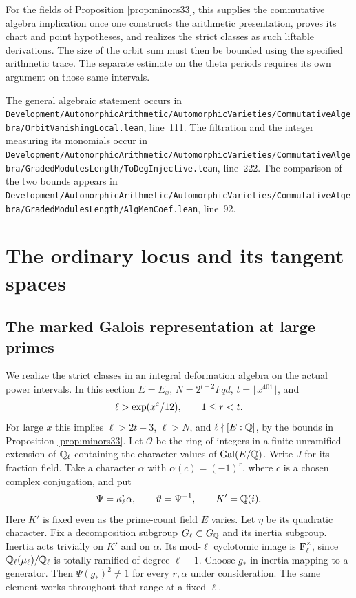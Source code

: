\documentclass[a4paper,11pt]{article}
\theoremstyle{definition}
\theoremstyle{remark}
\newcommand{\lead}[1]{\par\smallskip\noindent{\bfseries\color{ink}#1.}\enspace}
\newcommand{\srcloc}[2]{{\small\nolinkurl{#1.lean}}, line~#2}
\numberwithin{equation}{section}
\newcommand{\OO}{\mathcal O}
\begin{document}
For the fields of Proposition \ref{prop:minors33}, this supplies the commutative algebra implication once one constructs the arithmetic presentation, proves its chart and point hypotheses, and realizes the strict classes as such liftable derivations. The size of the orbit sum must then be bounded using the specified arithmetic trace. The separate estimate on the theta periods requires its own argument on those same intervals.

\lead{Locations in the accompanying source} The general algebraic statement occurs in \srcloc{Development/AutomorphicArithmetic/AutomorphicVarieties/CommutativeAlgebra/OrbitVanishingLocal}{111}. The filtration and the integer measuring its monomials occur in \srcloc{Development/AutomorphicArithmetic/AutomorphicVarieties/CommutativeAlgebra/GradedModulesLength/ToDegInjective}{222}. The comparison of the two bounds appears in \srcloc{Development/AutomorphicArithmetic/AutomorphicVarieties/CommutativeAlgebra/GradedModulesLength/AlgMemCoef}{92}.

\section{The ordinary locus and its tangent spaces}\label{nav:g-IV-2}

\subsection{The marked Galois representation at large primes}\label{nav:IV-09}
\label{sec:marked39}

We realize the strict classes in an integral deformation algebra on the actual power intervals. In this section \(E=E_x\), \(N=2^{l+2}Fqd\), \(t=\lfloor x^{401}\rfloor\), and
\[
       \ell>\exp(x^\varepsilon/12),\qquad 1\le r<t .
\]
For large \(x\) this implies \(\ell>2t+3\), \(\ell>N\), and \(\ell\nmid [E:\mathbb Q]\), by the bounds in Proposition \ref{prop:minors33}. Let \(\OO\) be the ring of integers in a finite unramified extension of \(\mathbb Q_\ell\) containing the character values of \(\operatorname{Gal}(E/\mathbb Q)\). Write \(J\) for its fraction field. Take a character \(\alpha\) with \(\alpha(c)=(-1)^r\), where \(c\) is a chosen complex conjugation, and put
\[
           \Psi=\kappa_\ell^r\alpha,\qquad
           \vartheta=\Psi^{-1},\qquad K'=\mathbb Q(i).
\]
Here \(K'\) is fixed even as the prime-count field \(E\) varies. Let \(\eta\) be its quadratic character. Fix a decomposition subgroup \(G_\ell\subset G_\mathbb Q\) and its inertia subgroup. Inertia acts trivially on \(K'\) and on \(\alpha\). Its mod-\(\ell\) cyclotomic image is \(\mathbf F_\ell^\times\), since \(\mathbb Q_\ell(\mu_\ell)/\mathbb Q_\ell\) is totally ramified of degree \(\ell-1\). Choose \(g_*\) in inertia mapping to a generator. Then \(\overline\Psi(g_*)^2\ne1\) for every \(r,\alpha\) under consideration. The same element works throughout that range at a fixed \(\ell\).
\end{document}
